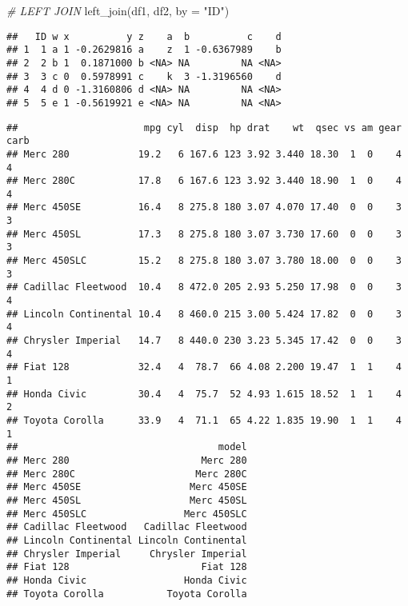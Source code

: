 \documentclass[
]{article}
\newenvironment{Shaded}{\begin{snugshade}}{\end{snugshade}}
\newcommand{\AttributeTok}[1]{\textcolor[rgb]{0.77,0.63,0.00}{#1}}
\newcommand{\CommentTok}[1]{\textcolor[rgb]{0.56,0.35,0.01}{\textit{#1}}}
\newcommand{\DecValTok}[1]{\textcolor[rgb]{0.00,0.00,0.81}{#1}}
\newcommand{\FunctionTok}[1]{\textcolor[rgb]{0.00,0.00,0.00}{#1}}
\newcommand{\NormalTok}[1]{#1}
\newcommand{\OtherTok}[1]{\textcolor[rgb]{0.56,0.35,0.01}{#1}}
\newcommand{\SpecialCharTok}[1]{\textcolor[rgb]{0.00,0.00,0.00}{#1}}
\newcommand{\StringTok}[1]{\textcolor[rgb]{0.31,0.60,0.02}{#1}}
\begin{document}
\begin{Shaded}
\begin{Highlighting}[]
\CommentTok{\# LEFT JOIN}
\FunctionTok{left\_join}\NormalTok{(df1, df2, }\AttributeTok{by =} \StringTok{"ID"}\NormalTok{)}
\end{Highlighting}
\end{Shaded}

\begin{verbatim}
##   ID w x          y z    a  b          c    d
## 1  1 a 1 -0.2629816 a    z  1 -0.6367989    b
## 2  2 b 1  0.1871000 b <NA> NA         NA <NA>
## 3  3 c 0  0.5978991 c    k  3 -1.3196560    d
## 4  4 d 0 -1.3160806 d <NA> NA         NA <NA>
## 5  5 e 1 -0.5619921 e <NA> NA         NA <NA>
\end{verbatim}

\begin{Shaded}
\end{Shaded}

\begin{verbatim}
##                      mpg cyl  disp  hp drat    wt  qsec vs am gear carb
## Merc 280            19.2   6 167.6 123 3.92 3.440 18.30  1  0    4    4
## Merc 280C           17.8   6 167.6 123 3.92 3.440 18.90  1  0    4    4
## Merc 450SE          16.4   8 275.8 180 3.07 4.070 17.40  0  0    3    3
## Merc 450SL          17.3   8 275.8 180 3.07 3.730 17.60  0  0    3    3
## Merc 450SLC         15.2   8 275.8 180 3.07 3.780 18.00  0  0    3    3
## Cadillac Fleetwood  10.4   8 472.0 205 2.93 5.250 17.98  0  0    3    4
## Lincoln Continental 10.4   8 460.0 215 3.00 5.424 17.82  0  0    3    4
## Chrysler Imperial   14.7   8 440.0 230 3.23 5.345 17.42  0  0    3    4
## Fiat 128            32.4   4  78.7  66 4.08 2.200 19.47  1  1    4    1
## Honda Civic         30.4   4  75.7  52 4.93 1.615 18.52  1  1    4    2
## Toyota Corolla      33.9   4  71.1  65 4.22 1.835 19.90  1  1    4    1
##                                   model
## Merc 280                       Merc 280
## Merc 280C                     Merc 280C
## Merc 450SE                   Merc 450SE
## Merc 450SL                   Merc 450SL
## Merc 450SLC                 Merc 450SLC
## Cadillac Fleetwood   Cadillac Fleetwood
## Lincoln Continental Lincoln Continental
## Chrysler Imperial     Chrysler Imperial
## Fiat 128                       Fiat 128
## Honda Civic                 Honda Civic
## Toyota Corolla           Toyota Corolla
\end{verbatim}
\end{document}
